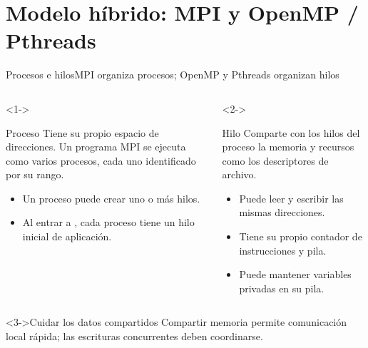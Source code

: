 \documentclass[handout,aspectratio=169,10pt]{beamer}
\newcommand{\code}[1]{\texttt{\detokenize{#1}}}
\begin{document}
\section{Modelo híbrido: MPI y OpenMP / Pthreads}
\begin{frame}{Procesos e hilos}{MPI organiza procesos; OpenMP y Pthreads organizan hilos}
\begin{columns}[T,onlytextwidth]
\begin{uncoverenv}<1->
\begin{block}{Proceso}
Tiene su propio espacio de direcciones. Un programa MPI se ejecuta como varios procesos,
cada uno identificado por su rango.
\end{block}
\begin{itemize}\setlength\itemsep{6pt}
\item Un proceso puede crear uno o más hilos.
\item Al entrar a \code{main}, cada proceso tiene un hilo inicial de aplicación.
\end{itemize}
\end{uncoverenv}
\begin{uncoverenv}<2->
\begin{block}{Hilo}
Comparte con los hilos del proceso la memoria y recursos como los descriptores de archivo.
\end{block}
\begin{itemize}\setlength\itemsep{6pt}
\item Puede leer y escribir las mismas direcciones.
\item Tiene su propio contador de instrucciones y pila.
\item Puede mantener variables privadas en su pila.
\end{itemize}
\end{uncoverenv}
\end{columns}
\begin{block}<3->{Cuidar los datos compartidos}
Compartir memoria permite comunicación local rápida; las escrituras concurrentes deben coordinarse.
\end{block}
\end{frame}
\end{document}
